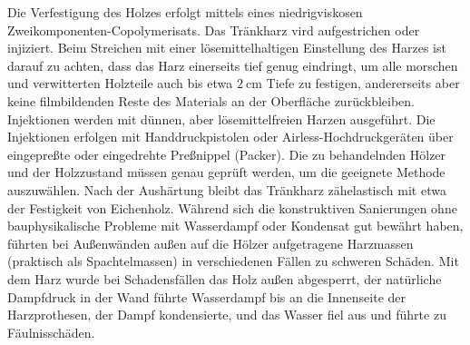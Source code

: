 \documentclass[fleqn,twoside]{article}
\begin{document}
           Die Verfestigung des Holzes erfolgt mittels eines niedrigviskosen Zweikomponenten-Copolymerisats. Das Tränkharz vird aufgestrichen oder injiziert. Beim Streichen mit einer lösemittelhaltigen Einstellung des Harzes ist darauf zu achten, dass das Harz einerseits tief genug eindringt, um alle morschen und verwitterten Holzteile auch bis etwa $2 \mathrm{~cm}$ Tiefe zu festigen, andererseits aber keine filmbildenden Reste des Materials an der Oberfläche zurückbleiben. Injektionen werden mit dünnen, aber lösemittelfreien Harzen ausgeführt. Die Injektionen erfolgen mit Handdruckpistolen oder Airless-Hochdruckgeräten über eingepreßte oder eingedrehte Preßnippel (Packer). Die zu behandelnden Hölzer und der Holzzustand müssen genau geprüft werden, um die geeignete Methode auszuwählen. Nach der Aushärtung bleibt das Tränkharz zähelastisch mit etwa der Festigkeit von Eichenholz. Während sich die konstruktiven Sanierungen ohne bauphysikalische Probleme mit Wasserdampf oder Kondensat gut bewährt haben, führten bei Außenwänden außen auf die Hölzer aufgetragene Harzmassen (praktisch als Spachtelmassen) in verschiedenen Fällen zu schweren Schäden. Mit dem Harz wurde bei Schadensfällen das Holz außen abgesperrt, der natürliche Dampfdruck in der Wand führte Wasserdampf bis an die Innenseite der Harzprothesen, der Dampf kondensierte, und das Wasser fiel aus und führte zu Fäulnisschäden.
\end{document}
